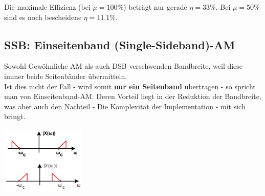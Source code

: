 Die maximale Effizienz (bei $\mu = 100\% $) beträgt nur gerade $ \eta = 33\% $. Bei $\mu = 50\% $
sind es noch bescheidene $\eta = 11.1\% $.

\subsection{SSB: Einseitenband (Single-Sideband)-AM }
	\begin{minipage}{14cm}
		Sowohl Gewöhnliche AM als auch DSB verschwenden Bandbreite, weil diese immer beide Seitenbänder übermitteln. \\ 
		Ist dies nicht der Fall - wird somit \textbf{nur ein Seitenband} übertragen - so spricht man von 	Einseitenband-AM. Deren Vorteil liegt in der Reduktion der Bandbreite, was aber auch den Nachteil 	- Die Komplexität der Implementation - mit sich bringt.
	\end{minipage}
	\begin{minipage}{5cm}
		\includegraphics[width = 4cm]{bilder/am_ssb_spektrum}
	\end{minipage}

